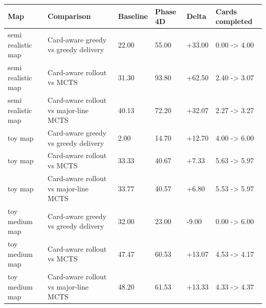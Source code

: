 \begin{tabular}{llllll}
\hline
Map & Comparison & Baseline & Phase 4D & Delta & Cards completed \\
\hline
semi realistic map & Card-aware greedy vs greedy delivery & 22.00 & 55.00 & +33.00 & 0.00 -> 4.00 \\
semi realistic map & Card-aware rollout vs MCTS & 31.30 & 93.80 & +62.50 & 2.40 -> 3.07 \\
semi realistic map & Card-aware rollout vs major-line MCTS & 40.13 & 72.20 & +32.07 & 2.27 -> 3.27 \\
toy map & Card-aware greedy vs greedy delivery & 2.00 & 14.70 & +12.70 & 4.00 -> 6.00 \\
toy map & Card-aware rollout vs MCTS & 33.33 & 40.67 & +7.33 & 5.63 -> 5.97 \\
toy map & Card-aware rollout vs major-line MCTS & 33.77 & 40.57 & +6.80 & 5.53 -> 5.97 \\
toy medium map & Card-aware greedy vs greedy delivery & 32.00 & 23.00 & -9.00 & 0.00 -> 6.00 \\
toy medium map & Card-aware rollout vs MCTS & 47.47 & 60.53 & +13.07 & 4.53 -> 4.17 \\
toy medium map & Card-aware rollout vs major-line MCTS & 48.20 & 61.53 & +13.33 & 4.33 -> 4.37 \\
\hline
\end{tabular}
